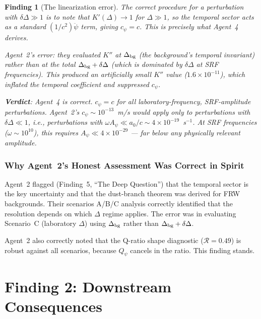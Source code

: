 \documentclass[11pt]{article}
\newtheorem{finding}{Finding}
\newcommand{\ee}[1]{\times 10^{#1}}
\newcommand{\Qpsi}{Q_\psi}
\begin{document}
\begin{finding}[The linearization error]
The correct procedure for a perturbation with $\delta\Delta \gg 1$
is to note that $K'(\Delta) \to 1$ for $\Delta \gg 1$, so the temporal
sector acts as a standard $(1/c^2)\ddot\psi$ term, giving $c_\psi = c$.
This is precisely what Agent~4 derives.

Agent~2's error: they evaluated $K''$ at $\Delta_{\rm bg}$ (the
background's temporal invariant) rather than at the total
$\Delta_{\rm bg} + \delta\Delta$ (which is dominated by
$\delta\Delta$ at SRF frequencies). This produced an artificially
small $K''$ value ($1.6\ee{-11}$), which inflated the temporal
coefficient and suppressed $c_\psi$.

\textbf{Verdict}: Agent~4 is correct. $c_\psi = c$ for all
laboratory-frequency, SRF-amplitude perturbations. Agent~2's
$c_\psi \sim 10^{-13}$~m/s would apply only to perturbations
with $\delta\Delta \ll 1$, i.e., perturbations with
$\omega A_\psi \ll a_0/c \sim 4\ee{-19}$~s$^{-1}$. At SRF
frequencies ($\omega \sim 10^{10}$), this requires $A_\psi \ll
4\ee{-29}$ --- far below any physically relevant amplitude.
\end{finding}


\section{Why Agent~2's Honest Assessment Was Correct in Spirit}
\label{sec:honest}

Agent~2 flagged (Finding~5, ``The Deep Question'') that the temporal
sector is the key uncertainty and that the dust-branch theorem was
derived for FRW backgrounds. Their scenarios A/B/C analysis correctly
identified that the resolution depends on which $\Delta$ regime
applies. The error was in evaluating Scenario~C (laboratory $\Delta$)
using $\Delta_{\rm bg}$ rather than $\Delta_{\rm bg} + \delta\Delta$.

Agent~2 also correctly noted that the Q-ratio shape diagnostic
($\mathcal{R} = 0.49$) is robust against all scenarios, because
$\Qpsi$ cancels in the ratio. This finding stands.


\part{Finding 2: Downstream Consequences}
\label{part:downstream}
\end{document}
